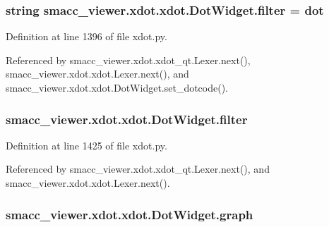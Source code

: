 \subsubsection[{\texorpdfstring{filter}{filter}}]{\setlength{\rightskip}{0pt plus 5cm}string smacc\+\_\+viewer.\+xdot.\+xdot.\+Dot\+Widget.\+filter = \textquotesingle{}dot\textquotesingle{}\hspace{0.3cm}{\ttfamily [static]}}\hypertarget{classsmacc__viewer_1_1xdot_1_1xdot_1_1DotWidget_ad0407b9aa639144d8681497d2b643705}{}\label{classsmacc__viewer_1_1xdot_1_1xdot_1_1DotWidget_ad0407b9aa639144d8681497d2b643705}


Definition at line 1396 of file xdot.\+py.



Referenced by smacc\+\_\+viewer.\+xdot.\+xdot\+\_\+qt.\+Lexer.\+next(), smacc\+\_\+viewer.\+xdot.\+xdot.\+Lexer.\+next(), and smacc\+\_\+viewer.\+xdot.\+xdot.\+Dot\+Widget.\+set\+\_\+dotcode().

\subsubsection[{\texorpdfstring{filter}{filter}}]{\setlength{\rightskip}{0pt plus 5cm}smacc\+\_\+viewer.\+xdot.\+xdot.\+Dot\+Widget.\+filter}\hypertarget{classsmacc__viewer_1_1xdot_1_1xdot_1_1DotWidget_a236d08842101f7d5283340254d984b31}{}\label{classsmacc__viewer_1_1xdot_1_1xdot_1_1DotWidget_a236d08842101f7d5283340254d984b31}


Definition at line 1425 of file xdot.\+py.



Referenced by smacc\+\_\+viewer.\+xdot.\+xdot\+\_\+qt.\+Lexer.\+next(), and smacc\+\_\+viewer.\+xdot.\+xdot.\+Lexer.\+next().

\subsubsection[{\texorpdfstring{graph}{graph}}]{\setlength{\rightskip}{0pt plus 5cm}smacc\+\_\+viewer.\+xdot.\+xdot.\+Dot\+Widget.\+graph}\hypertarget{classsmacc__viewer_1_1xdot_1_1xdot_1_1DotWidget_aff15668ab03bd98a12a6b00c1947eb5e}{}\label{classsmacc__viewer_1_1xdot_1_1xdot_1_1DotWidget_aff15668ab03bd98a12a6b00c1947eb5e}


